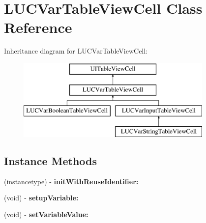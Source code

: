 \hypertarget{interface_l_u_c_var_table_view_cell}{}\section{L\+U\+C\+Var\+Table\+View\+Cell Class Reference}
\label{interface_l_u_c_var_table_view_cell}
Inheritance diagram for L\+U\+C\+Var\+Table\+View\+Cell\+:\begin{figure}[H]
\begin{center}
\leavevmode
\includegraphics[height=4.000000cm]{interface_l_u_c_var_table_view_cell}
\end{center}
\end{figure}
\subsection*{Instance Methods}
\begin{DoxyCompactItemize}
\item 
\mbox{\label{interface_l_u_c_var_table_view_cell_a8120d1ee6c33874b67d11dbd92e47837}} 
(instancetype) -\/ {\bfseries init\+With\+Reuse\+Identifier\+:}
\item 
\mbox{\label{interface_l_u_c_var_table_view_cell_ae92e85b40e2ddc61464290b3fe1892e4}} 
(void) -\/ {\bfseries setup\+Variable\+:}
\item 
\mbox{\label{interface_l_u_c_var_table_view_cell_a9a72d664c4c3cc2ee94ea1f9b83d545c}} 
(void) -\/ {\bfseries set\+Variable\+Value\+:}
\end{DoxyCompactItemize}
